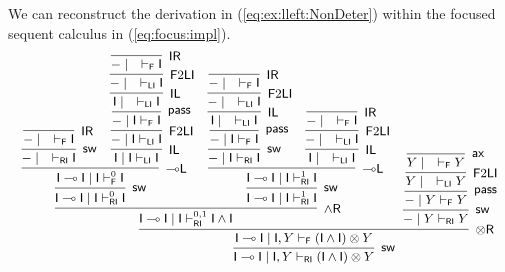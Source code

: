 \documentclass[submission,copyright,creativecommons]{eptcs}
\theoremstyle{definition}
\newcommand{\tr}{\otimes \mathsf{R}}
\newcommand{\lleft}{{\multimap}\mathsf{L}}
\newcommand{\pass}{\mathsf{pass}}
\newcommand{\unitl}{\mathsf{IL}}
\newcommand{\unitr}{\mathsf{IR}}
\newcommand{\andr}{\land \mathsf{R}}
\newcommand{\ax}{\mathsf{ax}}
\newcommand{\ot}{\otimes}
\newcommand{\lolli}{\multimap}
\newcommand{\I}{\mathsf{I}}
\newcommand{\RI}{\mathsf{RI}}
\newcommand{\LI}{\mathsf{LI}}
\newcommand{\F}{\mathsf{F}}
\newcommand{\sw}{\mathsf{sw}}
\newcommand{\proofbox}[1]{\begin{tabular}{l} #1 \end{tabular}}
\begin{document}
We can reconstruct the derivation in (\ref{eq:ex:lleft:NonDeter}) within the focused sequent calculus in (\ref{eq:focus:impl}).
\begin{displaymath}\small
  \infer[\sw]{\I \lolli \I \mid \I , Y \vdash_{\RI} (\I \land \I) \ot Y}{
    \infer[\tr]{\I \lolli \I \mid \I , Y \vdash_{\F} (\I \land \I) \ot Y}{
      \infer[\andr]{\I \lolli \I \mid \I \vdash^{0 , 1}_{\RI} \I \land \I}{
        \infer[\sw]{\I \lolli \I \mid \I \vdash^{0}_{\RI} \I}{
          \infer[\lleft]{\I \lolli \I \mid \I \vdash^{0}_{\F} \I}{
            \infer[\sw]{- \mid \quad \vdash_{\RI} \I}{
              \infer[\unitr]{- \mid \quad \vdash_{\F} \I}{}
            }
            &
            \infer[\unitl]{\I \mid \I \vdash_{\LI} \I}{
              \infer[\F 2 \LI]{- \mid \I \vdash_{\LI} \I}{
                \infer[\pass]{- \mid \I \vdash_{\F} \I}{
                  \infer[\unitl]{\I \mid \quad \vdash_{\LI} \I}{
                    \infer[\F 2 \LI]{- \mid \quad \vdash_{\LI} \I}{
                      \infer[\unitr]{- \mid \quad \vdash_{\F} \I}{}
                    }
                  }
                }
              }
            }
          }
        }
        &
        \infer[\sw]{\I \lolli \I \mid \I \vdash^{1}_{\RI} \I}{
          \infer[\lleft]{\I \lolli \I \mid \I \vdash^{1}_{\RI} \I}{
            \infer[\sw]{- \mid \I \vdash_{\RI} \I}{
              \infer[\pass]{- \mid \I \vdash_{\F} \I}{
                \infer[\unitl]{\I \mid \quad \vdash_{\LI} \I}{
                  \infer[\F 2 \LI]{- \mid \quad \vdash_{\LI} \I}{
                    \infer[\unitr]{- \mid \quad \vdash_{\F} \I}{}
                  }
                }
              }
            }
            &
            \infer[\unitl]{\I \mid \quad \vdash_{\LI} \I}{
              \infer[\F 2 \LI]{- \mid \quad \vdash_{\LI} \I}{
                \infer[\unitr]{- \mid \quad \vdash_{\F} \I}{}
              }
            }
          }
        }
      }
      &
      \infer[\sw]{- \mid Y \vdash_{\RI} Y}{
        \infer[\pass]{- \mid Y \vdash_{\F} Y}{
          \infer[\F 2 \LI]{Y \mid \quad \vdash_{\LI} Y}{
            \infer[\ax]{Y \mid \quad \vdash_{\F} Y}{}
          }
        }
      }
    }
  }
\end{displaymath}
\end{document}
